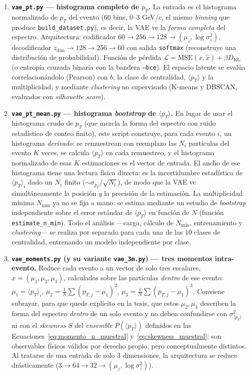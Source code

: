 \begin{enumerate}

\item \textbf{\texttt{vae\_pt.py} — histograma completo de $p_T$.} La
entrada es el histograma normalizado de $p_T$ del evento (60 bins,
0--3 GeV/$c$, el mismo \textit{binning} que produce
\texttt{build\_dataset.py}), es decir, la VAE ve la \emph{forma completa}
del espectro. Arquitectura: codificador $60\to256\to128\to(\mu_z,\log
\sigma_z^2)$, decodificador $z_{\dim}\to128\to256\to60$ con salida
\texttt{softmax} (reconstruye una distribución de probabilidad). Función de
pérdida $\mathcal{L}=\text{MSE}(x,\hat{x})+\beta D_{\text{KL}}$ (o
entropía cruzada binaria con la bandera \texttt{--bce}). El espacio latente
se evalúa correlacionándolo (Pearson) con $b$, la clase de centralidad,
$\langle p_T\rangle$ y la multiplicidad, y mediante \textit{clustering}
no supervisado (K-means y DBSCAN, evaluados con \textit{silhouette score}).

\item \textbf{\texttt{vae\_pt\_mean.py} — histograma \textit{bootstrap} de
$\langle p_T\rangle$.} En lugar de usar el histograma crudo de $p_T$ (que
mezcla la forma del espectro con ruido estadístico de conteo finito), este
script construye, para cada evento $i$, un histograma \emph{derivado}: se
remuestrean con reemplazo las $N_i$ partículas del evento $K$ veces, se
calcula $\langle p_T\rangle$ en cada remuestreo, y el histograma normalizado
de esas $K$ estimaciones es el vector de entrada. El ancho de ese
histograma tiene una lectura física directa: es la incertidumbre
estadística de $\langle p_T\rangle_i$ dado un $N_i$ finito
($\sim\sigma_{p_T}/\sqrt{N_i}$), de modo que la VAE ve simultáneamente la
posición \emph{y} la precisión de la estimación. La multiplicidad mínima
$N_{\min}$ ya no se fija a mano: se estima mediante un estudio de
\textit{bootstrap} independiente sobre el error estándar de
$\langle p_T\rangle$ en función de $N$ (función \texttt{estimate\_n\_min}).
Todo el análisis —carga, cálculo de $N_{\min}$, entrenamiento y
\textit{clustering}— se realiza por separado para cada una de las 10 clases
de centralidad, entrenando un modelo independiente por clase.

\item \textbf{\texttt{vae\_moments.py} (y su variante \texttt{vae\_3m.py})
— tres momentos intra-evento.} Reduce cada evento a un vector de solo tres
escalares, $x=(\mu_1,\mu_2,\mu_3)$, calculados sobre las partículas
\emph{dentro} de ese evento:
$\mu_1=\langle p_T\rangle_i$, $\mu_2=\frac{1}{N}\sum(p_{T,j}-\mu_1)^2$,
$\mu_3=\frac{1}{N}\sum(p_{T,j}-\mu_1)^3$. Conviene subrayar, para que quede
explícito en la tesis, que estos $\mu_2,\mu_3$ describen la forma del
espectro \emph{dentro} de un solo evento y no deben confundirse con
$\sigma^2_{\langle p_T\rangle}$ ni con el \textit{skewness} $S$ del
\emph{ensemble} $P(\langle p_T\rangle)$ definidos en las
Ecuaciones~\ref{eq:momento_n_muestral} y~\ref{eq:skewness_muestral}: son
observables físicos válidos por derecho propio, pero conceptualmente
distintos. Al tratarse de una entrada de solo 3 dimensiones, la arquitectura
se reduce drásticamente ($3\to64\to32\to(\mu_z,\log\sigma_z^2)$).


\end{enumerate}
